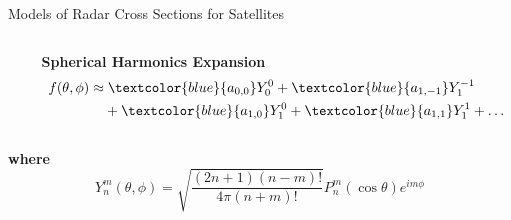 % 

\begin{frame}{Models of Radar Cross Sections for Satellites}
    \centering
    \begin{columns}[c,onlytextwidth]
        \begin{column}{0.4\textwidth}
            \centering
        \end{column}

        \begin{column}{0.6\textwidth}
            \centering
            \textbf{\large Spherical Harmonics Expansion} \\[0.8em]
            \begin{align*}
                f(\theta, \phi) \approx & \; \textcolor{blue}{a_{0,0}} Y_0^0 
                + \textcolor{blue}{a_{1,-1}} Y_1^{-1} \\
                & + \textcolor{blue}{a_{1,0}} Y_1^0 
                + \textcolor{blue}{a_{1,1}} Y_1^1 
                + \dots
            \end{align*}
        \end{column}
    \end{columns}

    \vspace{1em}
    \textbf{where}
    \[
    Y_n^m(\theta, \phi) = 
    \sqrt{\frac{(2n + 1)(n - m)!}{4\pi (n + m)!}} P_n^m(\cos \theta) e^{im\phi}
    \]
\end{frame}

\endinput  %
